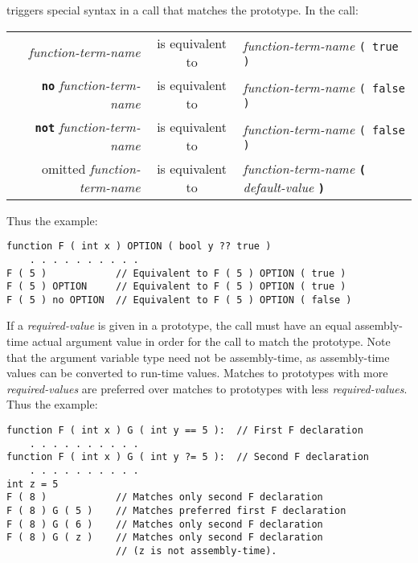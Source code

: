 \documentclass[12pt]{article}
\newcommand{\TT}[1]{{\tt \bfseries #1}}
\newenvironment{indpar}[1][0.3in]%
	{\begin{list}{}%
		     {\setlength{\itemsep}{0in}%
		      \setlength{\topsep}{0in}%
		      \setlength{\parsep}{1ex}%
		      \setlength{\labelwidth}{#1}%
		      \setlength{\leftmargin}{#1}%
		      \addtolength{\leftmargin}{\labelsep}}%
	 \item}%
	{\end{list}}
\begin{document}
triggers special syntax in a call that matches the prototype.
In the call:
\begin{center}
\begin{tabular}{rcl}
{\em function-term-name} & is equivalent to
                         & {\em function-term-name} \tt ( true ) \\
\TT{no} {\em function-term-name} & is equivalent to
                         & {\em function-term-name} \tt ( false ) \\
\TT{not} {\em function-term-name} & is equivalent to
                         & {\em function-term-name} \tt ( false ) \\
omitted {\em function-term-name} & is equivalent to
                         & {\em function-term-name}
			   \TT{(} {\em default-value} \TT{)} \\
\end{tabular}
\end{center}
Thus the example:
\begin{indpar}\begin{verbatim}
function F ( int x ) OPTION ( bool y ?? true )
    . . . . . . . . . .
F ( 5 )            // Equivalent to F ( 5 ) OPTION ( true )
F ( 5 ) OPTION     // Equivalent to F ( 5 ) OPTION ( true )
F ( 5 ) no OPTION  // Equivalent to F ( 5 ) OPTION ( false )
\end{verbatim}\end{indpar}

If a {\em required-value} is given in a prototype, the call must
have an equal assembly-time actual argument value
in order for the call to match the prototype.
Note that the argument variable type need not be assembly-time,
as assembly-time values can be converted to run-time values.
Matches to prototypes with more {\em required-values}
are preferred over matches to prototypes with less {\em required-values}.
Thus the example:
\begin{indpar}\begin{verbatim}
function F ( int x ) G ( int y == 5 ):  // First F declaration
    . . . . . . . . . .
function F ( int x ) G ( int y ?= 5 ):  // Second F declaration
    . . . . . . . . . .
int z = 5
F ( 8 )            // Matches only second F declaration
F ( 8 ) G ( 5 )    // Matches preferred first F declaration
F ( 8 ) G ( 6 )    // Matches only second F declaration
F ( 8 ) G ( z )    // Matches only second F declaration
                   // (z is not assembly-time).
\end{verbatim}\end{indpar}
\end{document}
